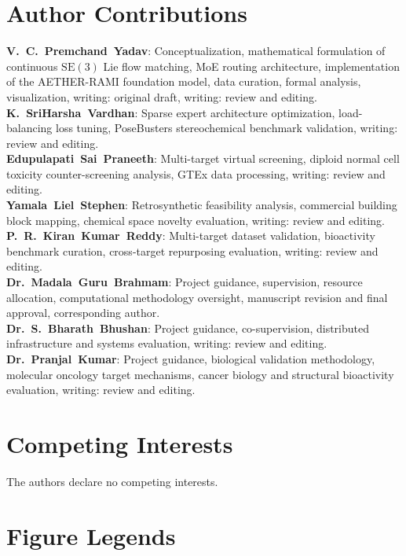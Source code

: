 \documentclass[11pt,a4paper]{article}
\begin{document}
\section*{Author Contributions}
\textbf{V.~C.~Premchand~Yadav}: Conceptualization, mathematical formulation of continuous $\mathrm{SE}(3)$ Lie flow matching, MoE routing architecture, implementation of the AETHER-RAMI foundation model, data curation, formal analysis, visualization, writing: original draft, writing: review and editing. \\
\textbf{K.~SriHarsha~Vardhan}: Sparse expert architecture optimization, load-balancing loss tuning, PoseBusters stereochemical benchmark validation, writing: review and editing. \\
\textbf{Edupulapati~Sai~Praneeth}: Multi-target virtual screening, diploid normal cell toxicity counter-screening analysis, GTEx data processing, writing: review and editing. \\
\textbf{Yamala~Liel~Stephen}: Retrosynthetic feasibility analysis, commercial building block mapping, chemical space novelty evaluation, writing: review and editing. \\
\textbf{P.~R.~Kiran~Kumar~Reddy}: Multi-target dataset validation, bioactivity benchmark curation, cross-target repurposing evaluation, writing: review and editing. \\
\textbf{Dr.~Madala~Guru~Brahmam}: Project guidance, supervision, resource allocation, computational methodology oversight, manuscript revision and final approval, corresponding author. \\
\textbf{Dr.~S.~Bharath~Bhushan}: Project guidance, co-supervision, distributed infrastructure and systems evaluation, writing: review and editing. \\
\textbf{Dr.~Pranjal~Kumar}: Project guidance, biological validation methodology, molecular oncology target mechanisms, cancer biology and structural bioactivity evaluation, writing: review and editing.

\section*{Competing Interests}
The authors declare no competing interests.

\newpage


\clearpage
\section*{Figure Legends}
\end{document}
